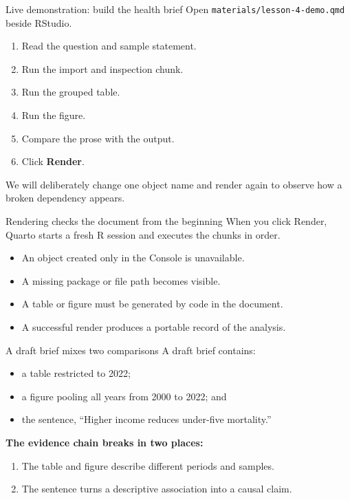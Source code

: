 \begin{frame}{Live demonstration: build the health brief}
Open \texttt{materials/lesson-4-demo.qmd} beside RStudio.
\begin{enumerate}
\item Read the question and sample statement.
\item Run the import and inspection chunk.
\item Run the grouped table.
\item Run the figure.
\item Compare the prose with the output.
\item Click \textbf{Render}.
\end{enumerate}
\vspace{0.25cm}
We will deliberately change one object name and render again to observe how a broken dependency appears.
\end{frame}

\begin{frame}{Rendering checks the document from the beginning}
When you click Render, Quarto starts a fresh R session and executes the chunks in order.
\begin{itemize}
\item An object created only in the Console is unavailable.
\item A missing package or file path becomes visible.
\item A table or figure must be generated by code in the document.
\item A successful render produces a portable record of the analysis.
\end{itemize}
\end{frame}

\begin{frame}{A draft brief mixes two comparisons}
A draft brief contains:
\begin{itemize}
\item a table restricted to 2022;
\item a figure pooling all years from 2000 to 2022; and
\item the sentence, ``Higher income reduces under-five mortality.''
\end{itemize}
\vspace{0.25cm}
\textbf{The evidence chain breaks in two places:}
\begin{enumerate}
\item The table and figure describe different periods and samples.
\item The sentence turns a descriptive association into a causal claim.
\end{enumerate}
\end{frame}

